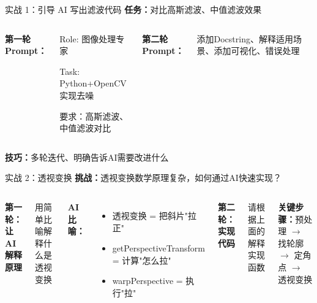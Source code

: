 
\begin{frame}{实战 1：引导 AI 写出滤波代码}
	\tiny
	\vspace{-0.8cm}
	\textbf{任务：}对比高斯滤波、中值滤波效果

	\begin{columns}
		\textbf{第一轮 Prompt：}
		\begin{exampleblock}{}
			Role: 图像处理专家

			Task: Python+OpenCV实现去噪

			要求：高斯滤波、中值滤波对比
		\end{exampleblock}

		\textbf{第二轮 Prompt：}
		\begin{exampleblock}{}
			添加Docstring、解释适用场景、添加可视化、错误处理
		\end{exampleblock}
	\end{columns}

	\tiny
	\textbf{技巧：}多轮迭代、明确告诉AI需要改进什么
\end{frame}


\begin{frame}{实战 2：透视变换}
	\tiny
	\textbf{挑战：}透视变换数学原理复杂，如何通过AI快速实现？

	\begin{columns}
		\column{0.5\textwidth}
		\textbf{第一轮：让AI解释原理}
		\begin{exampleblock}{}
			用简单比喻解释什么是透视变换
		\end{exampleblock}

		\textbf{AI比喻：}
		\begin{itemize}
			\item 透视变换 = 把斜片"拉正"
			\item getPerspectiveTransform = 计算"怎么拉"
			\item warpPerspective = 执行"拉"
		\end{itemize}

		\column{0.5\textwidth}
		\textbf{第二轮：实现代码}
		\begin{exampleblock}{}
			请根据上面的解释实现函数
		\end{exampleblock}

		\textbf{关键步骤：}预处理 $\to$ 找轮廓 $\to$ 定角点 $\to$ 透视变换
	\end{columns}
\end{frame}

